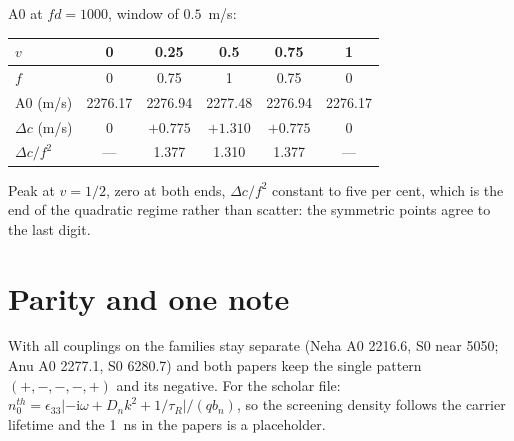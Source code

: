\documentclass[11pt,a4paper]{article}
\begin{document}
A0 at $fd=1000$, window of $0.5$~m/s:

\begin{center}\footnotesize
\begin{tabular}{lccccc}
\toprule
$v$ & 0 & 0.25 & 0.5 & 0.75 & 1\\
\midrule
$f$ & 0 & 0.75 & 1 & 0.75 & 0\\
A0 (m/s) & 2276.17 & 2276.94 & 2277.48 & 2276.94 & 2276.17\\
$\Delta c$ (m/s) & 0 & $+0.775$ & $+1.310$ & $+0.775$ & 0\\
$\Delta c/f^{2}$ & --- & 1.377 & 1.310 & 1.377 & ---\\
\bottomrule
\end{tabular}
\end{center}

Peak at $v=1/2$, zero at both ends, $\Delta c/f^{2}$ constant to five per cent, which is the end of
the quadratic regime rather than scatter: the symmetric points agree to the last digit.

\section*{Parity and one note}

With all couplings on the families stay separate (Neha A0 2216.6, S0 near 5050; Anu A0 2277.1, S0
6280.7) and both papers keep the single pattern $(+,-,-,-,+)$ and its negative. For the scholar
file: $n_0^{th}=\epsilon_{33}\lvert-\mathrm{i}\omega+D_nk^{2}+1/\tau_R\rvert/(qb_n)$, so the
screening density follows the carrier lifetime and the 1~ns in the papers is a placeholder.
\end{document}
